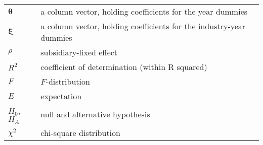\documentclass[10pt,twocolumn,oneside,cmyk]{article}
\begin{document}
\begin{center}
\begin{tabular}{l l}
  $\bm{\theta}$ &a column vector, holding coefficients for the year dummies \\
  $\bm{\xi}$ &a column vector, holding coefficients for the industry-year dummies \\
  $\rho$ &subsidiary-fixed effect \\
  $R^2$ &coefficient of determination (within R squared) \\
  $F$ &$F$-distribution \\
  $E$ &expectation \\
  $H_0$, $H_A$ &null and alternative hypothesis \\
  $\chi^2$ &chi-square distribution \\
  \bottomrule
 \end{tabular}
\end{center}
\newpage

\end{document}
